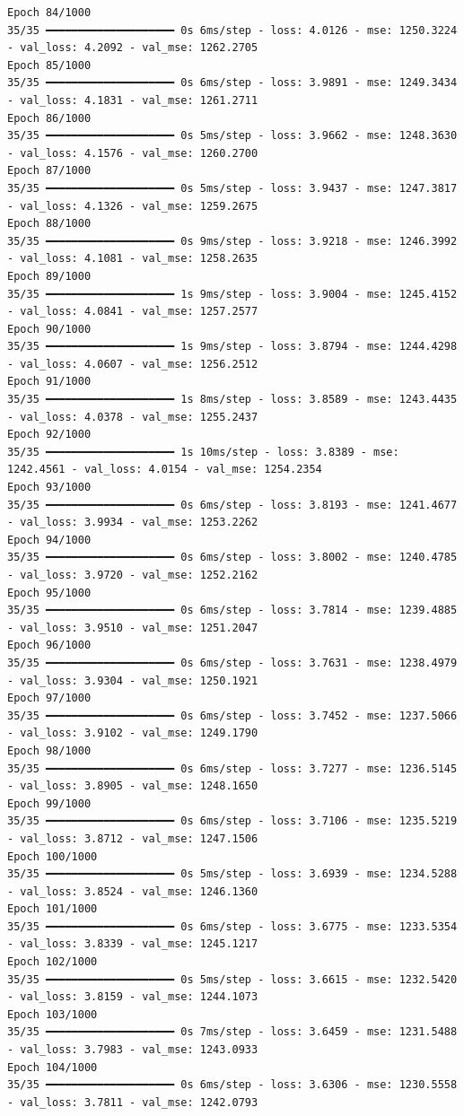 \documentclass[
  letterpaper,
  DIV=11,
  numbers=noendperiod]{scrreprt}
\begin{document}
\begin{verbatim}
Epoch 84/1000
35/35 ━━━━━━━━━━━━━━━━━━━━ 0s 6ms/step - loss: 4.0126 - mse: 1250.3224 - val_loss: 4.2092 - val_mse: 1262.2705
Epoch 85/1000
35/35 ━━━━━━━━━━━━━━━━━━━━ 0s 6ms/step - loss: 3.9891 - mse: 1249.3434 - val_loss: 4.1831 - val_mse: 1261.2711
Epoch 86/1000
35/35 ━━━━━━━━━━━━━━━━━━━━ 0s 5ms/step - loss: 3.9662 - mse: 1248.3630 - val_loss: 4.1576 - val_mse: 1260.2700
Epoch 87/1000
35/35 ━━━━━━━━━━━━━━━━━━━━ 0s 5ms/step - loss: 3.9437 - mse: 1247.3817 - val_loss: 4.1326 - val_mse: 1259.2675
Epoch 88/1000
35/35 ━━━━━━━━━━━━━━━━━━━━ 0s 9ms/step - loss: 3.9218 - mse: 1246.3992 - val_loss: 4.1081 - val_mse: 1258.2635
Epoch 89/1000
35/35 ━━━━━━━━━━━━━━━━━━━━ 1s 9ms/step - loss: 3.9004 - mse: 1245.4152 - val_loss: 4.0841 - val_mse: 1257.2577
Epoch 90/1000
35/35 ━━━━━━━━━━━━━━━━━━━━ 1s 9ms/step - loss: 3.8794 - mse: 1244.4298 - val_loss: 4.0607 - val_mse: 1256.2512
Epoch 91/1000
35/35 ━━━━━━━━━━━━━━━━━━━━ 1s 8ms/step - loss: 3.8589 - mse: 1243.4435 - val_loss: 4.0378 - val_mse: 1255.2437
Epoch 92/1000
35/35 ━━━━━━━━━━━━━━━━━━━━ 1s 10ms/step - loss: 3.8389 - mse: 1242.4561 - val_loss: 4.0154 - val_mse: 1254.2354
Epoch 93/1000
35/35 ━━━━━━━━━━━━━━━━━━━━ 0s 6ms/step - loss: 3.8193 - mse: 1241.4677 - val_loss: 3.9934 - val_mse: 1253.2262
Epoch 94/1000
35/35 ━━━━━━━━━━━━━━━━━━━━ 0s 6ms/step - loss: 3.8002 - mse: 1240.4785 - val_loss: 3.9720 - val_mse: 1252.2162
Epoch 95/1000
35/35 ━━━━━━━━━━━━━━━━━━━━ 0s 6ms/step - loss: 3.7814 - mse: 1239.4885 - val_loss: 3.9510 - val_mse: 1251.2047
Epoch 96/1000
35/35 ━━━━━━━━━━━━━━━━━━━━ 0s 6ms/step - loss: 3.7631 - mse: 1238.4979 - val_loss: 3.9304 - val_mse: 1250.1921
Epoch 97/1000
35/35 ━━━━━━━━━━━━━━━━━━━━ 0s 6ms/step - loss: 3.7452 - mse: 1237.5066 - val_loss: 3.9102 - val_mse: 1249.1790
Epoch 98/1000
35/35 ━━━━━━━━━━━━━━━━━━━━ 0s 6ms/step - loss: 3.7277 - mse: 1236.5145 - val_loss: 3.8905 - val_mse: 1248.1650
Epoch 99/1000
35/35 ━━━━━━━━━━━━━━━━━━━━ 0s 6ms/step - loss: 3.7106 - mse: 1235.5219 - val_loss: 3.8712 - val_mse: 1247.1506
Epoch 100/1000
35/35 ━━━━━━━━━━━━━━━━━━━━ 0s 5ms/step - loss: 3.6939 - mse: 1234.5288 - val_loss: 3.8524 - val_mse: 1246.1360
Epoch 101/1000
35/35 ━━━━━━━━━━━━━━━━━━━━ 0s 6ms/step - loss: 3.6775 - mse: 1233.5354 - val_loss: 3.8339 - val_mse: 1245.1217
Epoch 102/1000
35/35 ━━━━━━━━━━━━━━━━━━━━ 0s 5ms/step - loss: 3.6615 - mse: 1232.5420 - val_loss: 3.8159 - val_mse: 1244.1073
Epoch 103/1000
35/35 ━━━━━━━━━━━━━━━━━━━━ 0s 7ms/step - loss: 3.6459 - mse: 1231.5488 - val_loss: 3.7983 - val_mse: 1243.0933
Epoch 104/1000
35/35 ━━━━━━━━━━━━━━━━━━━━ 0s 6ms/step - loss: 3.6306 - mse: 1230.5558 - val_loss: 3.7811 - val_mse: 1242.0793

\end{verbatim}
\end{document}
